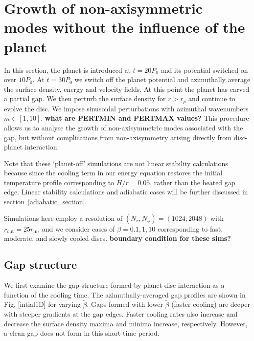 \section{Growth of non-axisymmetric modes without the influence of the
  planet}
In this section, the planet is introduced at $t=20P_0$ and 
its potential switched on over $10P_0$. At $t=30P_0$ we switch off the
planet potential and azimuthally average the surface density, energy
and velocity fields. At this point the planet has carved a partial
gap. We then perturb the surface density for $r>r_p$ and continue to 
evolve the disc. We impose  sinusoidal perturbations with 
azimuthal wavenumbers $m\in[1,10]$. {\bf what are PERTMIN and PERTMAX values?}  
This procedure allows us to analyse the growth of 
non-axisymmetric modes associated with the gap, but without
complications from non-axisymmetry arising directly from disc-planet
interaction.

Note that these `planet-off' simulations are not linear stability
calculations because since the cooling term in our energy equation
restores the initial temperature profile corresponding to $H/r=0.05$,
rather than the heated gap edge. Linear stability calculations and
adiabatic cases will be further discussed in
section~\ref{adiabatic_section}.  


Simulations here employ a resolution of $(N_r,N_{\phi})=(1024,2048)$
with $r_\mathrm{out}=25r_\mathrm{in}$, 
and we consider 
cases of $\tilde{\beta}=0.1,1,10$ corresponding to fast, moderate,
and slowly cooled discs.  {\bf boundary condition for these sims?}

\subsection{Gap structure}
We first examine the gap structure formed by planet-disc
interaction as a function of the cooling time. The azimuthally-averaged 
gap profiles are shown in Fig. \ref{intial1D} for varying
$\tilde\beta$. Gaps formed with lower $\tilde\beta$ (faster cooling)
are deeper with steeper gradients at the gap edges. Faster cooling rates also 
increase and decrease the surface density maxima and 
minima increase, respectively. However, a clean gap does not form
in this short time period. 


